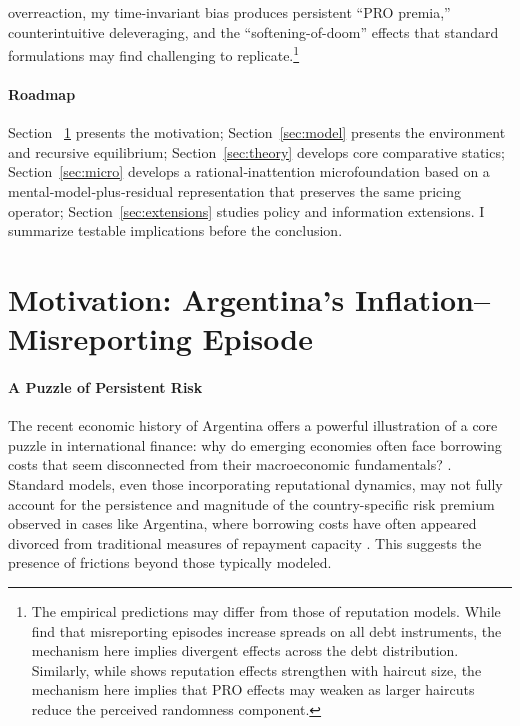 \documentclass[12pt]{article}
\theoremstyle{plain}
\begin{document}
overreaction, my time-invariant bias produces persistent ``PRO premia,''
counterintuitive deleveraging, and the ``softening-of-doom'' effects that
standard formulations may find challenging to replicate.\footnote{The empirical
	predictions may differ from those of reputation models. While
	\citet{MorelliMoretti2023} find that misreporting episodes increase spreads on
	all debt instruments, the mechanism here implies divergent effects across the
	debt distribution. Similarly, while \citet{AmadorPhelan2023} shows reputation
	effects strengthen with haircut size, the mechanism here implies that PRO
	effects may weaken as larger haircuts reduce the perceived randomness
	component.}

\paragraph{Roadmap} Section ~\ref{sec:motivation} presents the motivation; Section~\ref{sec:model}
presents the environment and recursive equilibrium; Section~\ref{sec:theory}
develops core comparative statics; Section~\ref{sec:micro} develops a
rational‑inattention microfoundation based on a mental‑model‑plus‑residual
representation that preserves the same pricing operator;
Section~\ref{sec:extensions} studies policy and information extensions. I
summarize testable implications before the conclusion.
\section{Motivation: Argentina's Inflation--Misreporting Episode}
\label{sec:motivation}

\paragraph{A Puzzle of Persistent Risk}
The recent economic history of Argentina offers a powerful illustration of a
core puzzle in international finance: why do emerging economies often face
borrowing costs that seem disconnected from their macroeconomic fundamentals?
\citet{TomzWright2013, MeyerReinhartTrebesch2022}. Standard models, even those
incorporating reputational dynamics, may not fully account for the persistence
and magnitude of the country-specific risk premium observed in cases like
Argentina, where borrowing costs have often appeared divorced from traditional
measures of repayment capacity \citet{MorelliMoretti2023}. This suggests the
presence of frictions beyond those typically modeled.
\end{document}
